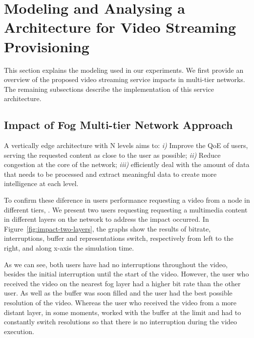 \section{Modeling and Analysing a Architecture for Video Streaming Provisioning}
\label{sec:system-archi}


This section explains the modeling used in our experiments. We first provide an overview of the proposed video streaming service impacts in multi-tier networks. The remaining subsections describe the implementation of this service architecture.

\subsection{Impact of Fog Multi-tier Network Approach}
A vertically edge architecture with N levels aims to: \textit{i)} Improve the QoE of users, serving the requested content as close to the user as possible; \textit{ii)} Reduce congestion at the core of the network; \textit{iii)} efficiently deal with the amount of data that needs to be processed and extract meaningful data to create more intelligence at each level. 

To confirm these diference in users performance requesting a video from a node in different tiers, . We present two users requesting requesting a multimedia content in different layers on the network to address the impact occurred. In Figure~\ref{fig:impact-two-layers}, the graphs show the results of bitrate, interruptions, buffer and representations switch, respectively from left to the right, and along x-axis the simulation time. 

As we can see, both users have had no interruptions throughout the video, besides the initial interruption until the start of the video. However, the user who received the video on the nearest fog layer had a higher bit rate than the other user. As well as the buffer was soon filled and the user had the best possible resolution of the video. Whereas the user who received the video from a more distant layer, in some moments, worked with the buffer at the limit and had to constantly switch resolutions so that there is no interruption during the video execution.


